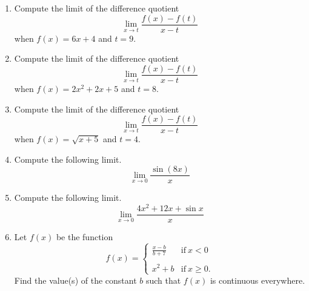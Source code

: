 \documentclass{article}
\begin{document}
\ActivityTitle[class=Calculus I, number=2, name=Continuity]

\begin{enumerate}
\item Compute the limit of the difference quotient \[ \lim_{x \rightarrow t} \frac{f(x) - f(t)}{x - t} \] when $f(x) = 6 x + 4$ and $t = 9$.



  

\item Compute the limit of the difference quotient \[ \lim_{x \rightarrow t} \frac{f(x) - f(t)}{x - t} \] when $f(x) = 2 x^2 + 2 x + 5$ and $t = 8$.



  

\item Compute the limit of the difference quotient \[ \lim_{x \rightarrow t} \frac{f(x) - f(t)}{x - t} \] when $f(x) = \sqrt{x + 5}$ and $t = 4$.



  

\item Compute the following limit. \[ \lim_{x \rightarrow 0} \frac{\sin(8 x)}{x} \]



  

\item Compute the following limit. \[ \lim_{x \rightarrow 0} \frac{4 x^2 + 12 x + \sin x}{x} \]



  

\item Let $f(x)$ be the function \[ f(x) = \left\{ \begin{array}{ll} \frac{x-b}{b + 7} & \mathrm{if}\ x < 0 \\ & \\ x^2 + b & \mathrm{if}\ x \geq 0. \end{array}\right. \] Find the value(s) of the constant $b$ such that $f(x)$ is continuous everywhere.



  
\end{enumerate}
\end{document}
